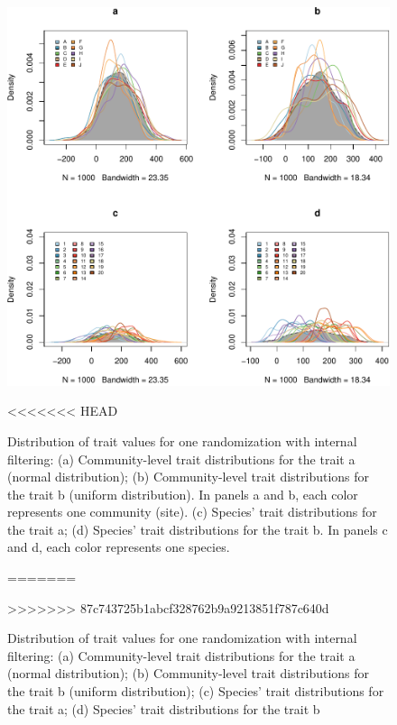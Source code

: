 \documentclass[12pt]{article}\usepackage[]{graphicx}\usepackage[]{color}
\makeatletter
\def\maxwidth{ %
  \ifdim\Gin@nat@width>\linewidth
    \linewidth
  \else
    \Gin@nat@width
  \fi
}
\newenvironment{knitrout}{}{} %
\makeatother
\begin{document}
\begin{landscape}
\begin{knitrout}
\begin{figure}
{\centering \includegraphics[width=\maxwidth]{figure/typical_result_internal_filtering1-1} 

}

<<<<<<< HEAD
\caption[Distribution of trait values for one randomization with internal filtering]{Distribution of trait values for one randomization with internal filtering: (a) Community-level trait distributions for the trait a (normal distribution); (b) Community-level trait distributions for the trait b (uniform distribution). In panels a and b, each color represents one community (site). (c) Species' trait distributions for the trait a; (d) Species' trait distributions for the trait b. In panels c and d, each color represents one species.}\label{fig:typical_result_internal_filtering1}
=======
\caption[Distribution of trait values for one randomization with internal filtering]{Distribution of trait values for one randomization with internal filtering: (a) Community-level trait distributions for the trait a (normal distribution); (b) Community-level trait distributions for the trait b (uniform distribution); (c) Species' trait distributions for the trait a; (d) Species' trait distributions for the trait b}\label{fig:typical_result_internal_filtering1}
>>>>>>> 87c743725b1abcf328762b9a9213851f787c640d
\end{figure}


\end{knitrout}


\end{landscape}
\end{document}
